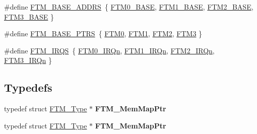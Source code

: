 \begin{DoxyCompactItemize}
\item 
\#define \hyperlink{group__FTM__Peripheral__Access__Layer_ga1477faad9a1808496012f4671f34f21d}{F\+T\+M\+\_\+\+B\+A\+S\+E\+\_\+\+A\+D\+D\+RS}~\{ \hyperlink{group__FTM__Peripheral__Access__Layer_ga2ababc70fbf6b51c721d870fa1c66e45}{F\+T\+M0\+\_\+\+B\+A\+SE}, \hyperlink{group__FTM__Peripheral__Access__Layer_ga15ff8bad7e6945154dcffe5dc7404fd1}{F\+T\+M1\+\_\+\+B\+A\+SE}, \hyperlink{group__FTM__Peripheral__Access__Layer_ga5f4976435e0a348f88929eaf23157bad}{F\+T\+M2\+\_\+\+B\+A\+SE}, \hyperlink{group__FTM__Peripheral__Access__Layer_gad7c56aa0db6bb5d095ce67d04031c615}{F\+T\+M3\+\_\+\+B\+A\+SE} \}
\item 
\#define \hyperlink{group__FTM__Peripheral__Access__Layer_ga1a5a7cb39d1713239478a1ebce2f05cc}{F\+T\+M\+\_\+\+B\+A\+S\+E\+\_\+\+P\+T\+RS}~\{ \hyperlink{group__FTM__Peripheral__Access__Layer_gac20d96b96f80ded87aa187f7519699ee}{F\+T\+M0}, \hyperlink{group__FTM__Peripheral__Access__Layer_ga48157ff57e27603582bc154901d44301}{F\+T\+M1}, \hyperlink{group__FTM__Peripheral__Access__Layer_gad4b8561c440952d2f7b095e4a7399a18}{F\+T\+M2}, \hyperlink{group__FTM__Peripheral__Access__Layer_ga60c8197c39b5da920e82cf4a4c8b2f49}{F\+T\+M3} \}
\item 
\#define \hyperlink{group__FTM__Peripheral__Access__Layer_ga2d6f3040cb83685eaa149fb202e070b5}{F\+T\+M\+\_\+\+I\+R\+QS}~\{ \hyperlink{group__Interrupt__vector__numbers_gga666eb0caeb12ec0e281415592ae89083a0854482d173dd9e02c5243c7174889fe}{F\+T\+M0\+\_\+\+I\+R\+Qn}, \hyperlink{group__Interrupt__vector__numbers_gga666eb0caeb12ec0e281415592ae89083a42c604a129920d567f55ca72ea546624}{F\+T\+M1\+\_\+\+I\+R\+Qn}, \hyperlink{group__Interrupt__vector__numbers_gga666eb0caeb12ec0e281415592ae89083a66b9fc24d16b6b398b195f0bf0d9e072}{F\+T\+M2\+\_\+\+I\+R\+Qn}, \hyperlink{group__Interrupt__vector__numbers_gga666eb0caeb12ec0e281415592ae89083ad7349ef3db8be3e2f76d179bb41329e8}{F\+T\+M3\+\_\+\+I\+R\+Qn} \}
\end{DoxyCompactItemize}
\subsection*{Typedefs}
\begin{DoxyCompactItemize}
\item 
typedef struct \hyperlink{structFTM__Type}{F\+T\+M\+\_\+\+Type} $\ast$ {\bfseries F\+T\+M\+\_\+\+Mem\+Map\+Ptr}\hypertarget{group__FTM__Peripheral__Access__Layer_ga16aff9c08c6a317497cacd203b654db5}{}\label{group__FTM__Peripheral__Access__Layer_ga16aff9c08c6a317497cacd203b654db5}

\item 
typedef struct \hyperlink{structFTM__Type}{F\+T\+M\+\_\+\+Type} $\ast$ {\bfseries F\+T\+M\+\_\+\+Mem\+Map\+Ptr}\hypertarget{group__FTM__Peripheral__Access__Layer_ga16aff9c08c6a317497cacd203b654db5}{}\label{group__FTM__Peripheral__Access__Layer_ga16aff9c08c6a317497cacd203b654db5}

\end{DoxyCompactItemize}


